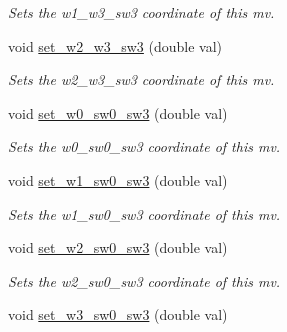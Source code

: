 \begin{DoxyCompactItemize}
\begin{DoxyCompactList}\small\item\em Sets the w1\-\_\-w3\-\_\-sw3 coordinate of this mv. \end{DoxyCompactList}\item 
\hypertarget{classe3ga_1_1mv_a04377dbd188d9c759ba93747ea50d3ea}{void \hyperlink{classe3ga_1_1mv_a04377dbd188d9c759ba93747ea50d3ea}{set\-\_\-w2\-\_\-w3\-\_\-sw3} (double val)}\label{classe3ga_1_1mv_a04377dbd188d9c759ba93747ea50d3ea}

\begin{DoxyCompactList}\small\item\em Sets the w2\-\_\-w3\-\_\-sw3 coordinate of this mv. \end{DoxyCompactList}\item 
\hypertarget{classe3ga_1_1mv_ac1d1dac34a4aedf408b85b6934a7e3a8}{void \hyperlink{classe3ga_1_1mv_ac1d1dac34a4aedf408b85b6934a7e3a8}{set\-\_\-w0\-\_\-sw0\-\_\-sw3} (double val)}\label{classe3ga_1_1mv_ac1d1dac34a4aedf408b85b6934a7e3a8}

\begin{DoxyCompactList}\small\item\em Sets the w0\-\_\-sw0\-\_\-sw3 coordinate of this mv. \end{DoxyCompactList}\item 
\hypertarget{classe3ga_1_1mv_a0fa3620bb8d6daf8d7ff409ebf2294d4}{void \hyperlink{classe3ga_1_1mv_a0fa3620bb8d6daf8d7ff409ebf2294d4}{set\-\_\-w1\-\_\-sw0\-\_\-sw3} (double val)}\label{classe3ga_1_1mv_a0fa3620bb8d6daf8d7ff409ebf2294d4}

\begin{DoxyCompactList}\small\item\em Sets the w1\-\_\-sw0\-\_\-sw3 coordinate of this mv. \end{DoxyCompactList}\item 
\hypertarget{classe3ga_1_1mv_a9423087a15480f82bd64e0129bf74dde}{void \hyperlink{classe3ga_1_1mv_a9423087a15480f82bd64e0129bf74dde}{set\-\_\-w2\-\_\-sw0\-\_\-sw3} (double val)}\label{classe3ga_1_1mv_a9423087a15480f82bd64e0129bf74dde}

\begin{DoxyCompactList}\small\item\em Sets the w2\-\_\-sw0\-\_\-sw3 coordinate of this mv. \end{DoxyCompactList}\item 
\hypertarget{classe3ga_1_1mv_a4a4e5902a1be15272c8dca3a5a1132ad}{void \hyperlink{classe3ga_1_1mv_a4a4e5902a1be15272c8dca3a5a1132ad}{set\-\_\-w3\-\_\-sw0\-\_\-sw3} (double val)}\label{classe3ga_1_1mv_a4a4e5902a1be15272c8dca3a5a1132ad}


\end{DoxyCompactItemize}
